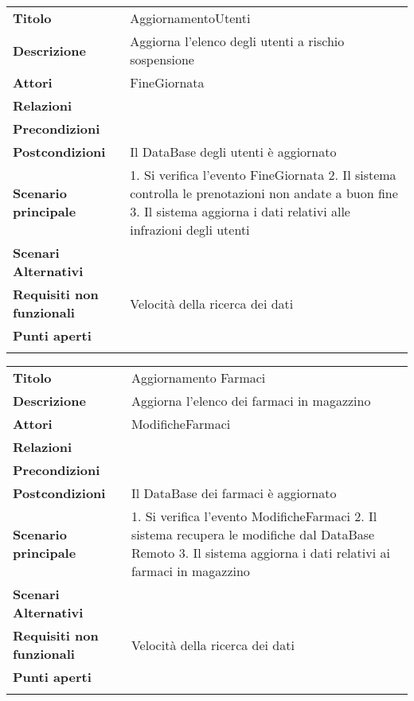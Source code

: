 \begin{longtable}[c]{@{}ll@{}}
\toprule\addlinespace
\textbf{Titolo} & AggiornamentoUtenti
\\\addlinespace
\textbf{Descrizione} & Aggiorna l'elenco degli utenti a rischio
sospensione
\\\addlinespace
\textbf{Attori} & FineGiornata
\\\addlinespace
\textbf{Relazioni} &
\\\addlinespace
\textbf{Precondizioni} &
\\\addlinespace
\textbf{Postcondizioni} & Il DataBase degli utenti è aggiornato
\\\addlinespace
\textbf{Scenario principale} & 1. Si verifica l'evento FineGiornata 2.
Il sistema controlla le prenotazioni non andate a buon fine 3. Il
sistema aggiorna i dati relativi alle infrazioni degli utenti
\\\addlinespace
\textbf{Scenari Alternativi} &
\\\addlinespace
\textbf{Requisiti non funzionali} & Velocità della ricerca dei dati
\\\addlinespace
\textbf{Punti aperti} &
\\\addlinespace
\bottomrule
\end{longtable}

\begin{longtable}[c]{@{}ll@{}}
\toprule\addlinespace
\textbf{Titolo} & Aggiornamento Farmaci
\\\addlinespace
\textbf{Descrizione} & Aggiorna l'elenco dei farmaci in magazzino
\\\addlinespace
\textbf{Attori} & ModificheFarmaci
\\\addlinespace
\textbf{Relazioni} &
\\\addlinespace
\textbf{Precondizioni} &
\\\addlinespace
\textbf{Postcondizioni} & Il DataBase dei farmaci è aggiornato
\\\addlinespace
\textbf{Scenario principale} & 1. Si verifica l'evento ModificheFarmaci
2. Il sistema recupera le modifiche dal DataBase Remoto 3. Il sistema
aggiorna i dati relativi ai farmaci in magazzino
\\\addlinespace
\textbf{Scenari Alternativi} &
\\\addlinespace
\textbf{Requisiti non funzionali} & Velocità della ricerca dei dati
\\\addlinespace
\textbf{Punti aperti} &
\\\addlinespace
\bottomrule
\end{longtable}

